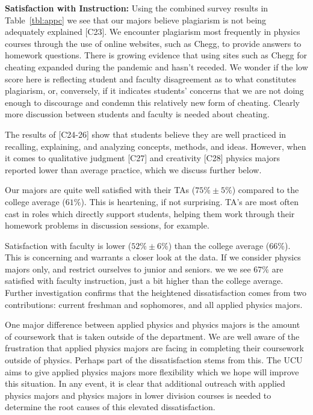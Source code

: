 \documentclass[12pt]{article}
\begin{document}
\noindent
{\bf Satisfaction with Instruction:} Using the combined survey results
in Table~\ref{tbl:appc} we see that our majors believe plagiarism is
not being adequately explained [C23].  We encounter plagiarism most
frequently in physics courses through the use of online websites, such
as Chegg, to provide answers to homework questions.  There is growing
evidence that using sites such as Chegg for cheating expanded during
the pandemic and hasn't receded.  We wonder if the low score here is
reflecting student and faculty disagreement as to what constitutes
plagiarism, or, conversely, if it indicates students' concerns that we
are not doing enough to discourage and condemn this relatively new
form of cheating.  Clearly more discussion between students and
faculty is needed about cheating.

The results of [C24-26] show that students believe they are well
practiced in recalling, explaining, and analyzing concepts, methods,
and ideas.  However, when it comes to qualitative judgment [C27] and
creativity [C28] physics majors reported lower than average practice,
which we discuss further below.

Our majors are quite well satisfied with their TAs ($75\% \pm 5\%$)
compared to the college average ($61\%$).  This is heartening, if not
surprising.  TA's are most often cast in roles which directly support
students, helping them work through their homework problems in
discussion sessions, for example.

Satisfaction with faculty is lower ($52\% \pm 6\%$) than the college
average ($66\%$).  This is concerning and warrants a closer look at the
data.  If we consider physics majors only, and restrict ourselves to
junior and seniors. we we see 67\% are satisfied with faculty
instruction, just a bit higher than the college average.  Further
investigation confirms that the heightened dissatisfaction comes from
two contributions: current freshman and sophomores, and all applied
physics majors.

One major difference between applied physics and physics majors is the
amount of coursework that is taken outside of the department. We
are well aware of the frustration that applied physics majors are
facing in completing their coursework outside of physics.  Perhaps
part of the dissatisfaction stems from this.  The UCU aims to give
applied physics majors more flexibility which we hope will improve
this situation.  In any event, it is clear that additional outreach
with applied physics majors and physics majors in lower division
courses is needed to determine the root causes of this elevated
dissatisfaction.\\[3pt]
\end{document}
